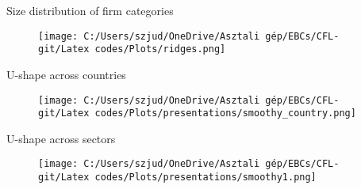 \documentclass[notes]{beamer}
\begin{document}
\begin{frame}[label=distrib]{Size distribution of firm categories}
\begin{figure}[H]  %
    \centering
    \texttt{[image: C:/Users/szjud/OneDrive/Asztali gép/EBCs/CFL-git/Latex codes/Plots/ridges.png]}
\end{figure}
\begin{center}
\hyperlink{slide2}{}
\end{center}
\end{frame}

\begin{frame}[label=U_country]{U-shape across countries}
\begin{figure}[H]  %
    \centering
    \texttt{[image: C:/Users/szjud/OneDrive/Asztali gép/EBCs/CFL-git/Latex codes/Plots/presentations/smoothy\_country.png]}
\end{figure}
\begin{center}
\hyperlink{slide3}{}
\end{center}
\end{frame}

\begin{frame}[label=U_sector]{U-shape across sectors}
\begin{figure}[H]  %
    \centering
    \texttt{[image: C:/Users/szjud/OneDrive/Asztali gép/EBCs/CFL-git/Latex codes/Plots/presentations/smoothy1.png]}
\end{figure}
\begin{center}
\hyperlink{slide3}{}
\end{center}
\end{frame}
\end{document}
